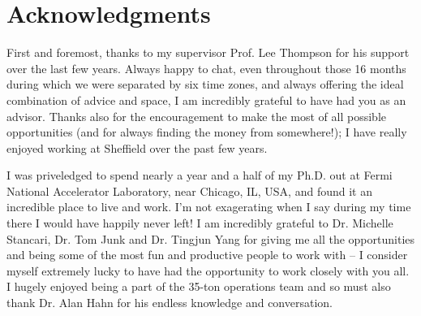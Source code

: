 
\chapter*{Acknowledgments}








First and foremost, thanks to my supervisor Prof. Lee Thompson for his support over the last few years.  Always happy to chat, even throughout those 16 months during which we were separated by six time zones, and always offering the ideal combination of advice and space, I am incredibly grateful to have had you as an advisor.  Thanks also for the encouragement to make the most of all possible opportunities (and for always finding the money from somewhere!); I have really enjoyed working at Sheffield over the past few years.

I was priveledged to spend nearly a year and a half of my Ph.D. out at Fermi National Accelerator Laboratory, near Chicago, IL, USA, and found it an incredible place to live and work.  I'm not exagerating when I say during my time there I would have happily never left!  I am incredibly grateful to Dr. Michelle Stancari, Dr. Tom Junk and Dr. Tingjun Yang for giving me all the opportunities and being some of the most fun and productive people to work with -- I consider myself extremely lucky to have had the opportunity to work closely with you all.  I hugely enjoyed being a part of the 35-ton operations team and so must also thank Dr. Alan Hahn for his endless knowledge and conversation.

